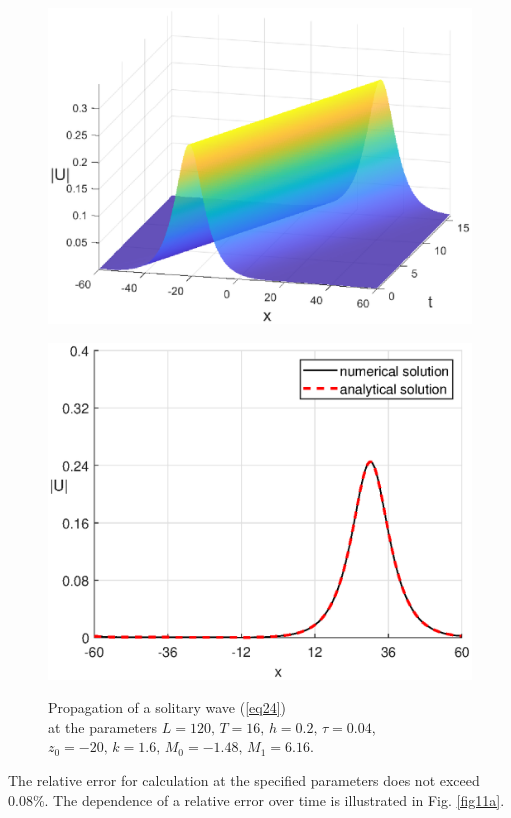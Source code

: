 \documentclass[preprint,12pt]{elsarticle}
\begin{document}
\begin{figure}[H]
\begin{center}
\begin{minipage}[h]{0.48\linewidth} %
\includegraphics[width=1\linewidth]{fig11.eps}
\label{fig10a}
\end{minipage}
\hfill
\begin{minipage}[h]{0.48\linewidth}
\includegraphics[width=1\linewidth]{fig12.eps}
\label{fig10b}
\end{minipage}
\end{center}
\caption{Propagation of a solitary wave (\ref{eq24}) \\
at the parameters
\(L=120,\, T=16,\, h=0.2,\, \tau=0.04\), 
\(z_{0}=-20,\,k=1.6,\, M_{0}=-1.48,\, M_{1}=6.16\).}
\label{fig10}
\end{figure}
The relative error for calculation at the specified parameters does not exceed 0.08\%.  The dependence of a relative error over time is illustrated in Fig. \ref{fig11a}.
\end{document}
